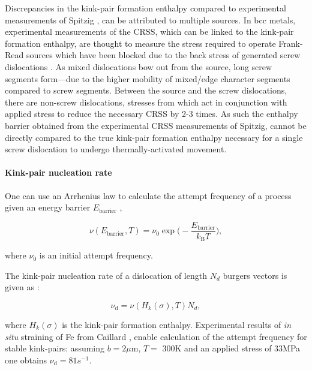 \documentclass[a4paper,11pt]{article}
\numberwithin{equation}{chapter}
\numberwithin{listing}{chapter}
\begin{document}
Discrepancies in the kink-pair formation enthalpy compared to experimental
measurements of Spitzig \cite{Spitzig_1970}, can be attributed to multiple
sources. In bcc metals, experimental measurements of the CRSS, which can be
linked to the kink-pair formation enthalpy, are thought to measure the
stress required to operate Frank-Read sources which have been blocked due to
the back stress of generated screw dislocations \cite{Groger2007}. As mixed
dislocations bow out from the source, long screw segments form---due to the
higher mobility of mixed/edge character segments compared to screw
segments. Between the source and the screw dislocations, there are non-screw
dislocations, stresses from which act in conjunction with applied stress to
reduce the necessary CRSS by 2-3 times. As such the enthalpy barrier
obtained from the experimental CRSS measurements of Spitzig, cannot be
directly compared to the true kink-pair formation enthalpy necessary for a
single screw dislocation to undergo thermally-activated movement.

\paragraph{Kink-pair nucleation rate}
\label{sec:org51deca0}
\label{sec:kink-pair_nucleation_rate}

One can use an Arrhenius law to calculate the attempt frequency of a process given an
energy barrier \(E_{\text{barrier} }\) \cite{Henkelman2000},

\begin{equation} \label{eq:jumprate}
   \nu ( E_{\text{barrier}},T ) = \nu_0 \exp \big( - \frac{ E_{\text{barrier} }}{ k_{\text{B}} T} \big),
\end{equation}

where \(\nu_0\) is an initial attempt frequency.

The kink-pair nucleation rate of a dislocation of length \(N_d\) burgers vectors is
given as \cite{itakura13_effec_hydrog_atoms_screw_disloc}:


\begin{equation} \label{eq:kinkrate}
\nu_{\text{d}} = \nu ( H_k(\sigma),T ) N_d,
\end{equation}

where \(H_k(\sigma)\) is the kink-pair formation
enthalpy. Experimental results of \emph{in situ} straining of Fe from Caillard
\cite{Caillard2010}, enable calculation of the attempt frequency for stable
kink-pairs: assuming \(b = 2\mu\text{m}\), \(T=\) 300K and an applied stress of
33MPa one obtains \(\nu_{\text{d} } = 81s^{-1}\).
\end{document}
